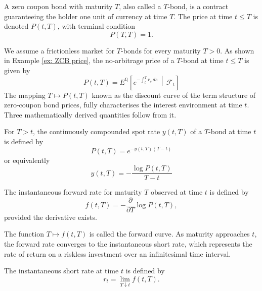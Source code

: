 \begin{definition}
A zero coupon bond with maturity $T$, also called a $T$-bond, is a contract guaranteeing the holder one unit of currency at time $T$. The price at time $t\leq T$ is denoted $P(t,T)$, with terminal condition
$$P(T,T)=1.$$
\end{definition}

We assume a frictionless market for $T$-bonds for every maturity $T>0$. As shown in Example \ref{ex: ZCB price}, the no-arbitrage price of a $T$-bond at time $t\leq T$ is given by 
\begin{equation}
    P(t,T)=E^\mathbb{Q}\left[e^{-\int_t^T r_s\,ds}\,\middle|\,\mathcal{F}_t\right]
    \label{ZCBprice}
\end{equation}
The mapping $T \mapsto P(t,T)$ known as the discount curve of the term structure of zero-coupon bond prices, fully characterises the interest environment at time $t$. Three mathematically derived quantities follow from it. 


\begin{definition}
    For $T>t$, the continuously compounded spot rate $y(t,T)$ of a $T$-bond at time $t$ is defined by 
    \begin{equation}
        P(t,T)=e^{-y(t,T)(T-t)} 
        \label{eq:yield1}
    \end{equation}
    or equivalently
    \begin{equation}
        y(t,T)=-\frac{\log P(t,T)}{T-t} 
        \label{eq:yield2}
    \end{equation}
\end{definition}


\begin{definition}
The instantaneous forward rate for maturity $T$ observed at time $t$ is defined by
\begin{equation}
f(t,T)=-\frac{\partial}{\partial T}\log P(t,T),
\label{eq:inst_forward}
\end{equation}
provided the derivative exists. 
\end{definition}

The function $T\mapsto f(t,T)$ is called the forward curve. As maturity approaches $t$, the forward rate converges to the instantaneous short rate, which represents the rate of return on a riskless investment over an infinitesimal time interval.

\begin{definition}
\label{def:instshortrate}
The instantaneous short rate at time $t$ is defined by
\begin{equation}
    r_t=\lim_{T\downarrow t} f(t,T).
\end{equation}
\end{definition}

